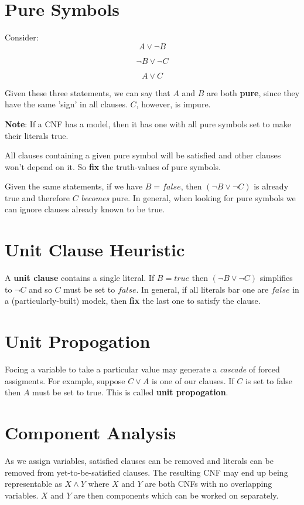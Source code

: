\documentclass[11pt]{article}
\begin{document}
\section{Pure Symbols}
\label{sec:org25af95f}
Consider:
\begin{equation}
A \lor \neg B
\end{equation}

\begin{equation}
\neg B \lor \neg C
\end{equation}

\begin{equation}
A \lor C
\end{equation}

Given these three statements, we can say that \(A\) and \(B\) are both \textbf{pure}, since they have the same 'sign' in all clauses.
\(C\), however, is impure.

\textbf{Note}: If a CNF has a model, then it has one with all pure symbols set to make their literals true.

All clauses containing a given pure symbol will be satisfied and other clauses won't depend on it.
So \textbf{fix} the truth-values of pure symbols.

Given the same statements, if we have \(B = false\), then \((\neg B \lor \neg C)\) is already true and therefore \(C\) \emph{becomes} pure.
In general, when looking for pure symbols we can ignore clauses already known to be true.

\section{Unit Clause Heuristic}
\label{sec:org431c5ce}
A \textbf{unit clause} contains a single literal.
If \(B = true\) then \((\neg B \lor \neg C)\) simplifies to \(\neg C\) and so \(C\) must be set to \(false\).
In general, if all literals bar one are \(false\) in a (particularly-built) modek, then \textbf{fix} the last one to satisfy the clause.

\section{Unit Propogation}
\label{sec:org17e6f87}
Focing a variable to take a particular value may generate a \emph{cascade} of forced assigments.
For example, suppose \(C \lor A\) is one of our clauses.
If \(C\) is set to false then \(A\) must be set to true.
This is called \textbf{unit propogation}.

\section{Component Analysis}
\label{sec:org55b2faa}
As we assign variables, satisfied clauses can be removed and literals can be removed from yet-to-be-satisfied clauses.
The resulting CNF may end up being representable as \(X \land Y\) where \(X\) and \(Y\) are both CNFs with no overlapping variables.
\(X\) and \(Y\) are then components which can be worked on separately.
\end{document}
